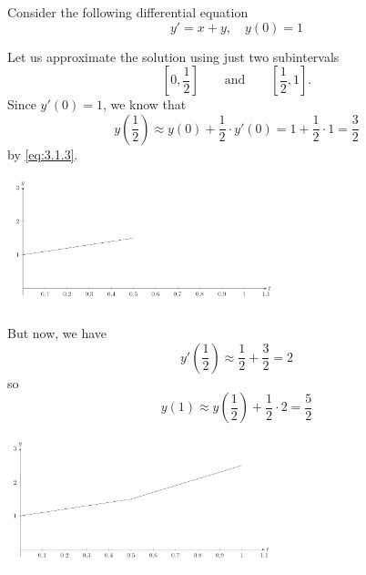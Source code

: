 \documentclass{ximera}
\begin{document}
\begin{example}\label{ex:eulerIntro1}
Consider the following differential equation
$$y' = x+y,\quad y(0)=1$$
 
Let us approximate the solution using just two subintervals
$$
\left[0,\frac{1}{2}\right]\qquad\text{and}\qquad \left[\frac{1}{2},1\right].
$$
Since $y'(0) = 1$, we know that
$$
y\left(\frac{1}{2}\right)\approx y(0)+\frac{1}{2}\cdot y'(0)= 1+ \frac{1}{2}\cdot 1 = \frac{3}{2}
$$
by \eqref{eq:3.1.3}.

\begin{image}
 \includegraphics[height=1.5in]{fig030101.jpg} 
\end{image}


But now, we have
$$
y'\left(\frac{1}{2}\right) \approx \frac{1}{2}+\frac{3}{2} = 2
$$
so
$$
y(1) \approx  y\left(\frac{1}{2}\right)+\frac{1}{2} \cdot 2= \frac{5}{2}
$$

\begin{image}
 \includegraphics[height=1.5in]{fig030102.jpg} 
\end{image}


\end{example}
\end{document}
